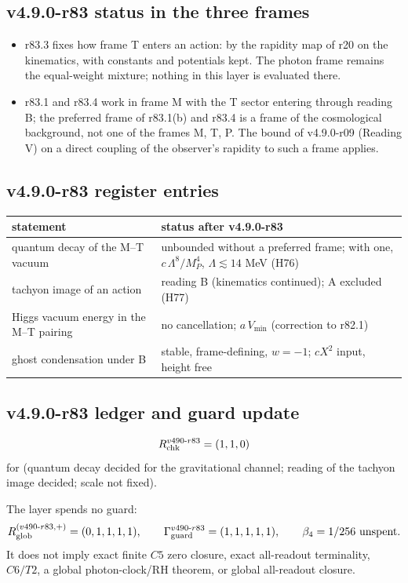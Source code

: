 \subsection*{v4.9.0-r83 status in the three frames}
\label{subsec:v490-r83-frames}

\begin{itemize}[leftmargin=2em]
\item r83.3 fixes how frame T enters an action: by the rapidity map of r20 on the kinematics, with constants and potentials kept.  The
photon frame remains the equal-weight mixture; nothing in this layer is evaluated there.
\item r83.1 and r83.4 work in frame M with the T sector entering through reading B; the preferred frame of r83.1(b) and r83.4 is a
frame of the cosmological background, not one of the frames M, T, P.  The bound of v4.9.0-r09 (Reading V) on a direct coupling of the
observer's rapidity to such a frame applies.
\end{itemize}

\subsection*{v4.9.0-r83 register entries}
\label{subsec:v490-r83-register}

\begin{center}
\small
\begin{tabular}{@{}>{\raggedright\arraybackslash}p{}>{\raggedright\arraybackslash}p{}@{}}
\toprule
statement & status after v4.9.0-r83\\
\midrule
quantum decay of the M--T vacuum & unbounded without a preferred frame; with one, \(c\,\Lambda^8/M_P^4\), \(\Lambda\lesssim14\) MeV (H76)\\
tachyon image of an action & reading B (kinematics continued); A excluded (H77)\\
Higgs vacuum energy in the M--T pairing & no cancellation; \(a\,V_{\min}\) (correction to r82.1)\\
ghost condensation under B & stable, frame-defining, \(w=-1\); \(cX^2\) input, height free\\
\bottomrule
\end{tabular}
\end{center}

\subsection*{v4.9.0-r83 ledger and guard update}
\label{subsec:v490-r83-ledger-guard}

\[
R_{\rm chk}^{v490\text{-}r83}=(1,1,0)
\]
for (quantum decay decided for the gravitational channel; reading of the tachyon image decided; scale not fixed).

The layer spends no guard:
\[
R_{\rm glob}^{(v490\text{-}r83,+)}=(0,1,1,1,1),
\qquad
\Gamma_{\rm guard}^{v490\text{-}r83}=(1,1,1,1,1),
\qquad
\beta_4=1/256\ \text{unspent}.
\]
It does not imply exact finite \(C5\) zero closure, exact all-readout terminality,
\(C6/T2\), a global photon-clock/RH theorem, or global all-readout closure.
